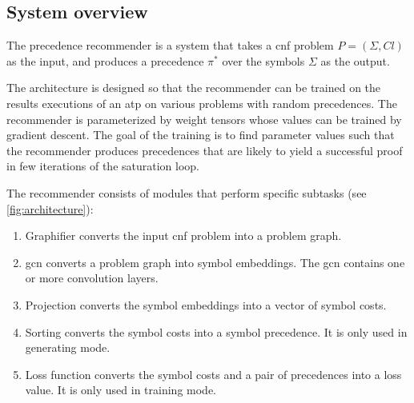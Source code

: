 \fi

\subsection{System overview}

The precedence recommender is a system that takes
a \gls{cnf} problem $P = (\Sigma, \mathit{Cl})$ as the input,
and produces a precedence $\pi^*$ over the symbols $\Sigma$ as the output.

The architecture is designed so that the recommender can be trained
on the results executions of an \gls{atp} on various problems with random precedences.
The recommender is parameterized by weight tensors
whose values can be trained by gradient descent.
The goal of the training is to find parameter values
such that the recommender produces precedences
that are likely to yield a successful proof in few iterations of the saturation loop.

The recommender consists of modules that perform specific subtasks (see \cref{fig:architecture}):
\begin{enumerate}
\item Graphifier converts the input \gls{cnf} problem into a problem graph.
\item \gls{gcn} converts a problem graph into symbol embeddings.
The \gls{gcn} contains one or more convolution layers.
\item Projection converts the symbol embeddings into a vector of symbol costs.
\item Sorting converts the symbol costs into a symbol precedence.
It is only used in generating mode.
\item Loss function converts the symbol costs and a pair of precedences into a loss value.
It is only used in training mode.
\end{enumerate}

